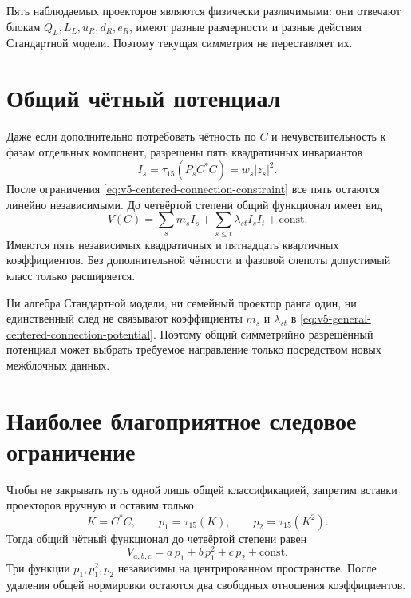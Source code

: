 Пять наблюдаемых проекторов являются физически различимыми: они отвечают
блокам \(Q_L,L_L,u_R,d_R,e_R\), имеют разные размерности и разные действия
Стандартной модели. Поэтому текущая симметрия не переставляет их.

\section{Общий чётный потенциал}

Даже если дополнительно потребовать чётность по \(C\) и нечувствительность
к фазам отдельных компонент, разрешены пять квадратичных инвариантов
\begin{equation}
 I_s=\tau_{15}(P_sC^*C)=w_s|z_s|^2.
\end{equation}
После ограничения \eqref{eq:v5-centered-connection-constraint} все пять
остаются линейно независимыми. До четвёртой степени общий функционал имеет
вид
\begin{equation}
 V(C)=\sum_s m_s I_s+\sum_{s\le t}\lambda_{st}I_sI_t+\mathrm{const}.
 \label{eq:v5-general-centered-connection-potential}
\end{equation}
Имеются пять независимых квадратичных и пятнадцать квартичных коэффициентов.
Без дополнительной чётности и фазовой слепоты допустимый класс только
расширяется.

\begin{proposition}
Ни алгебра Стандартной модели, ни семейный проектор ранга один, ни
единственный след не связывают коэффициенты \(m_s\) и
\(\lambda_{st}\) в
\eqref{eq:v5-general-centered-connection-potential}. Поэтому общий
симметрийно разрешённый потенциал может выбрать требуемое направление
только посредством новых межблочных данных.
\end{proposition}

\section{Наиболее благоприятное следовое ограничение}

Чтобы не закрывать путь одной лишь общей классификацией, запретим вставки
проекторов вручную и оставим только
\begin{equation}
 K=C^*C,\qquad
 p_1=\tau_{15}(K),\qquad
 p_2=\tau_{15}(K^2).
\end{equation}
Тогда общий чётный функционал до четвёртой степени равен
\begin{equation}
 V_{a,b,c}=a\,p_1+b\,p_1^2+c\,p_2+\mathrm{const}.
 \label{eq:v5-trace-only-centered-potential}
\end{equation}
Три функции \(p_1,p_1^2,p_2\) независимы на центрированном пространстве.
После удаления общей нормировки остаются два свободных отношения
коэффициентов.

